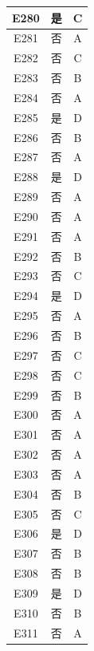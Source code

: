 \documentclass[UTF8]{ctexart}
\begin{document}
\begin{center}
\begin{longtable}{|c|c|c|}
		E280     & 是       & C        \\ \hline
		E281     & 否       & A        \\ \hline
		E282     & 否       & C        \\ \hline
		E283     & 否       & B        \\ \hline
		E284     & 否       & A        \\ \hline
		E285     & 是       & D        \\ \hline
		E286     & 否       & B        \\ \hline
		E287     & 否       & A        \\ \hline
		E288     & 是       & D        \\ \hline
		E289     & 否       & A        \\ \hline
		E290     & 否       & A        \\ \hline
		E291     & 否       & A        \\ \hline
		E292     & 否       & B        \\ \hline
		E293     & 否       & C        \\ \hline
		E294     & 是       & D        \\ \hline
		E295     & 否       & A        \\ \hline
		E296     & 否       & B        \\ \hline
		E297     & 否       & C        \\ \hline
		E298     & 否       & C        \\ \hline
		E299     & 否       & B        \\ \hline
		E300     & 否       & A        \\ \hline
		E301     & 否       & A        \\ \hline
		E302     & 否       & A        \\ \hline
		E303     & 否       & A        \\ \hline
		E304     & 否       & B        \\ \hline
		E305     & 否       & C        \\ \hline
		E306     & 是       & D        \\ \hline
		E307     & 否       & B        \\ \hline
		E308     & 否       & B        \\ \hline
		E309     & 是       & D        \\ \hline
		E310     & 否       & B        \\ \hline
		E311     & 否       & A        \\ \hline

\end{longtable}
\end{center}
\end{document}
